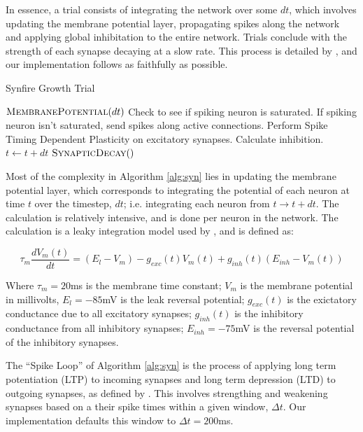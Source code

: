 \documentclass[a4paper]{article}
\begin{document}
In essence, a trial consists of integrating the network over some $dt$, which involves updating the membrane potential layer, propagating spikes along the network and applying global inhibitation to the entire network. Trials conclude with the strength of each synapse decaying at a slow rate. This process is detailed by \cite{synfire}, and our implementation follows as faithfully as possible.

\begin{algorithm}[H]
\caption{Synfire Growth Trial}
\label{alg:syn}
\begin{algorithmic}
	\State $\textsc{MembranePotential}(dt)$
		\State Check to see if spiking neuron is saturated.
		\State If spiking neuron isn't saturated, send spikes along active connections.
		\State Perform Spike Timing Dependent Plasticity on excitatory synapses.
	\EndFor
		\State Calculate inhibition.
	\EndFor
	\State $t \gets t + dt$
\EndWhile
\State $\textsc{SynapticDecay}()$
\end{algorithmic}
\end{algorithm}

Most of the complexity in Algorithm \ref{alg:syn} lies in updating the membrane potential layer, which corresponds to integrating the potential of each neuron at time $t$ over the timestep, $dt$; i.e. integrating each neuron from $t \rightarrow t + dt$. The calculation is relatively intensive, and is done per neuron in the network. The calculation is a leaky integration model used by \cite{synfire}, and is defined as:

$$\tau_m\frac{dV_m(t)}{dt} = (E_l - V_m) - g_{exc}(t)V_m(t)+g_{inh}(t)(E_{inh}-V_m(t))$$

Where $\tau_m = 20$ms is the membrane time constant; $V_m$ is the membrane potential in millivolts, $E_l = -85$mV is the leak reversal potential; $g_{exc}(t)$ is the exictatory conductance due to all excitatory synapses; $g_{inh}(t)$ is the inhibitory conductance from all inhibitory synapses; $E_{inh} = -75$mV is the reversal potential of the inhibitory synapses. 

The ``Spike Loop'' of Algorithm \ref{alg:syn} is the process of applying long term potentiation (LTP) to incoming synapses and long term depression (LTD) to outgoing synapses, as defined by \cite{synfire}. This involves strengthing and weakening synapses based on a their spike times within a given window, $\Delta t$. Our implementation defaults this window to $\Delta t = 200$ms.
\end{document}
